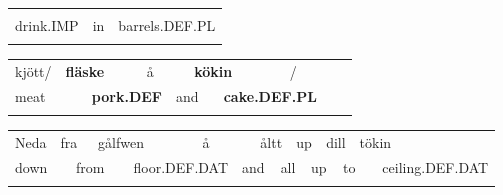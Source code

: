 \begin{styleExText}

\end{styleExText}

\begin{tabular}{lll}
\lsptoprule
\multicolumn{3}{l}{Drick

}\\
drink.IMP & in & barrels.DEF.PL\\
\lspbottomrule
\end{tabular}

\begin{tabular}{llllllllll}
\lsptoprule
kjött/ & \multicolumn{2}{l}{{\bfseries fläske}

} & \multicolumn{2}{l}{å

} & \multicolumn{2}{l}{{\bfseries kökin}

} & \multicolumn{2}{l}{/

} & \\
\multicolumn{2}{l}{meat

} & \multicolumn{2}{l}{{\bfseries pork.DEF}

} & \multicolumn{2}{l}{and

} & \multicolumn{2}{l}{{\bfseries cake.DEF.PL}

} & \multicolumn{2}{l}{}\\
\lspbottomrule
\end{tabular}

\begin{tabular}{llllllllllllllll}
\lsptoprule
Neda & \multicolumn{2}{l}{fra

} & \multicolumn{2}{l}{gålfwen

} & \multicolumn{2}{l}{å

} & \multicolumn{2}{l}{åltt

} & \multicolumn{2}{l}{up

} & \multicolumn{2}{l}{dill

} & \multicolumn{2}{l}{tökin

} & \\
\multicolumn{2}{l}{down

} & \multicolumn{2}{l}{from

} & \multicolumn{2}{l}{floor.DEF.DAT

} & \multicolumn{2}{l}{and

} & \multicolumn{2}{l}{all

} & \multicolumn{2}{l}{up

} & \multicolumn{2}{l}{to

} & \multicolumn{2}{l}{ceiling.DEF.DAT

}\\
\lspbottomrule
\end{tabular}

